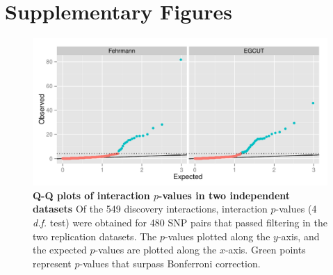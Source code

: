 \documentclass{article}
\begin{document}





\clearpage
\section{Supplementary Figures}
\setcounter{figure}{0}
\makeatletter 
\renewcommand{\thefigure}{S\@arabic\c@figure} 
\makeatletter 

\begin{figure}[H]
	\includegraphics[width=5in]{qqbonf}
	\caption{\textbf{Q-Q plots of interaction $p$-values in two independent datasets} Of the 549 discovery interactions, interaction $p$-values (4 \emph{d.f.} test) were obtained for 480 SNP pairs that passed filtering in the two replication datasets. The $p$-values plotted along the $y$-axis, and the expected $p$-values are plotted along the $x$-axis. Green points represent $p$-values that surpass Bonferroni correction.}
	\label{fig:qqplotbonf}
\end{figure}
\clearpage
\end{document}
